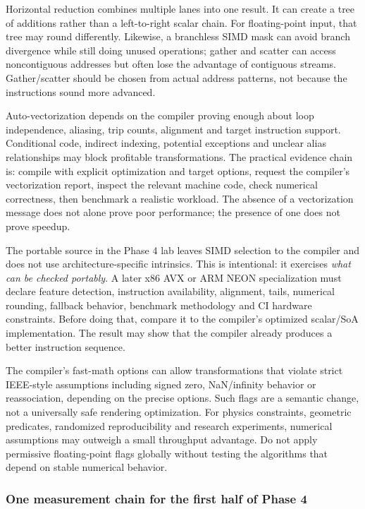 Horizontal reduction combines multiple lanes into one result. It can create a tree of additions rather than a left-to-right scalar chain. For floating-point input, that tree may round differently. Likewise, a branchless SIMD mask can avoid branch divergence while still doing unused operations; gather and scatter can access noncontiguous addresses but often lose the advantage of contiguous streams. Gather/scatter should be chosen from actual address patterns, not because the instructions sound more advanced.

Auto-vectorization depends on the compiler proving enough about loop independence, aliasing, trip counts, alignment and target instruction support. Conditional code, indirect indexing, potential exceptions and unclear alias relationships may block profitable transformations. The practical evidence chain is: compile with explicit optimization and target options, request the compiler's vectorization report, inspect the relevant machine code, check numerical correctness, then benchmark a realistic workload. The absence of a vectorization message does not alone prove poor performance; the presence of one does not prove speedup.

The portable source in the Phase 4 lab leaves SIMD selection to the compiler and does not use architecture-specific intrinsics. This is intentional: it exercises \emph{what can be checked portably}. A later x86 AVX or ARM NEON specialization must declare feature detection, instruction availability, alignment, tails, numerical rounding, fallback behavior, benchmark methodology and CI hardware constraints. Before doing that, compare it to the compiler's optimized scalar/SoA implementation. The result may show that the compiler already produces a better instruction sequence.

The compiler's fast-math options can allow transformations that violate strict IEEE-style assumptions including signed zero, NaN/infinity behavior or reassociation, depending on the precise options. Such flags are a semantic change, not a universally safe rendering optimization. For physics constraints, geometric predicates, randomized reproducibility and research experiments, numerical assumptions may outweigh a small throughput advantage. Do not apply permissive floating-point flags globally without testing the algorithms that depend on stable numerical behavior.

\subsubsection{One measurement chain for the first half of Phase 4}\label{one-measurement-chain-for-the-first-half-of-phase-4}

